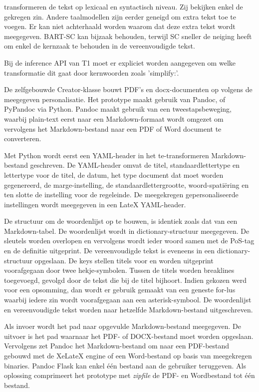 
transformeren de tekst op lexicaal en syntactisch niveau. Zij bekijken enkel de gekregen zin. Andere taalmodellen zijn eerder geneigd om extra tekst toe te voegen. Er kan niet achterhaald worden waarom dat deze extra tekst wordt meegegeven. BART-SC kan bijzaak behouden, terwijl SC sneller de neiging heeft om enkel de kernzaak te behouden in de vereenvoudigde tekst. 

Bij de inference API van T1 moet er expliciet worden aangegeven om welke transformatie dit gaat door kernwoorden zoals 'simplify:'.

\medspace

De zelfgebouwde Creator-klasse bouwt PDF's en docx-documenten op volgens de meegegeven personalisatie. Het prototype maakt gebruik van Pandoc, of PyPandoc via Python. Pandoc maakt gebruik van een tweestapsbeweging, waarbij plain-text eerst naar een Markdown-formaat wordt omgezet om vervolgens het Markdown-bestand naar een PDF of Word document te converteren.

\medspace

Met Python wordt eerst een YAML-header in het te-transformeren Markdown-bestand geschreven. De YAML-header omvat de titel, standaardlettertype en lettertype voor de titel, de datum, het type document dat moet worden gegenereerd, de marge-instelling, de standaardlettergrootte, woord-spatiëring en ten slotte de instelling voor de regeleinde. De meegekregen gepersonaliseerde instellingen wordt meegegeven in een LateX YAML-header.

\medspace

De structuur om de woordenlijst op te bouwen, is identiek zoals dat van een Markdown-tabel. De  woordenlijst wordt in dictionary-structuur meegegeven. De sleutels worden overlopen en vervolgens wordt ieder woord samen met de PoS-tag en de definitie uitgeprint. De vereenvoudigde tekst is eveneens in een dictionary-structuur opgeslaan. De keys stellen titels voor en worden uitgeprint voorafgegaan door twee hekje-symbolen. Tussen de titels worden breaklines toegevoegd, gevolgd door de tekst die bij de titel bijhoort. Indien gekozen werd voor een opsomming, dan wordt er gebruik gemaakt van een geneste for-lus waarbij iedere zin wordt voorafgegaan aan een asterisk-symbool. De woordenlijst en vereenvoudigde tekst worden naar hetzelfde Markdown-bestand uitgeschreven. 

\medspace

Als invoer wordt het pad naar opgevulde Markdown-bestand meegegeven. De uitvoer is het pad waarnaar het PDF- of DOCX-bestand moet worden opgeslaan. Vervolgens zet Pandoc het Markdown-bestand om naar een PDF-bestand gebouwd met de XeLateX engine of een Word-bestand op basis van meegekregen binaries. Pandoc Flask kan enkel één bestand aan de gebruiker teruggeven. Als oplossing comprimeert het prototype met \textit{zipfile} de PDF- en Wordbestand tot één bestand. 

